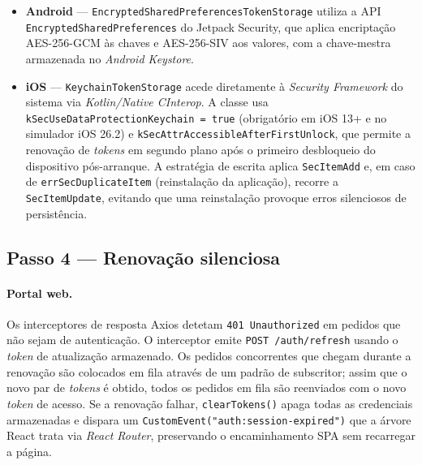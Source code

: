 \begin{itemize}
  \item \textbf{Android} — \texttt{EncryptedSharedPreferencesTokenStorage}
    utiliza a API \texttt{EncryptedSharedPreferences} do Jetpack Security,
    que aplica encriptação AES-256-GCM às chaves e AES-256-SIV aos valores,
    com a chave-mestra armazenada no \textit{Android Keystore}.

  \item \textbf{iOS} — \texttt{KeychainTokenStorage} acede diretamente à
    \textit{Security Framework} do sistema via \textit{Kotlin/Native CInterop}.
    A classe usa \texttt{kSecUseDataProtectionKeychain = true} (obrigatório
    em iOS 13+ e no simulador iOS 26.2) e
    \texttt{kSecAttrAccessibleAfterFirstUnlock}, que permite a renovação de
    \textit{tokens} em segundo plano após o primeiro desbloqueio do
    dispositivo pós-arranque.
    A estratégia de escrita aplica \texttt{SecItemAdd} e, em caso de
    \texttt{errSecDuplicateItem} (reinstalação da aplicação), recorre a
    \texttt{SecItemUpdate}, evitando que uma reinstalação provoque erros
    silenciosos de persistência.
\end{itemize}

\subsection*{Passo 4 — Renovação silenciosa}

\paragraph{Portal web.}
Os interceptores de resposta Axios detetam \texttt{401 Unauthorized}
em pedidos que não sejam de autenticação.
O interceptor emite \texttt{POST /auth/refresh} usando o \textit{token}
de atualização armazenado.
Os pedidos concorrentes que chegam durante a renovação são colocados em
fila através de um padrão de subscritor; assim que o novo par de
\textit{tokens} é obtido, todos os pedidos em fila são reenviados com o
novo \textit{token} de acesso.
Se a renovação falhar, \texttt{clearTokens()} apaga todas as credenciais
armazenadas e dispara um \texttt{CustomEvent("auth:session-expired")} que
a árvore React trata via \textit{React Router}, preservando o encaminhamento
SPA sem recarregar a página.

